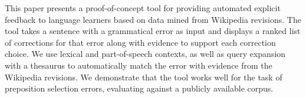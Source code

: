 This paper presents a proof-of-concept tool for providing automated explicit feedback to language learners based on data mined from Wikipedia revisions. The tool takes a sentence with a grammatical error as input and displays a ranked list of corrections for that error along with evidence to support each correction choice. We use lexical and part-of-speech contexts, as well as query expansion with a thesaurus to automatically match the error with evidence from the Wikipedia revisions. We demonstrate that the tool works well for the task of preposition selection errors, evaluating against a publicly available corpus.
